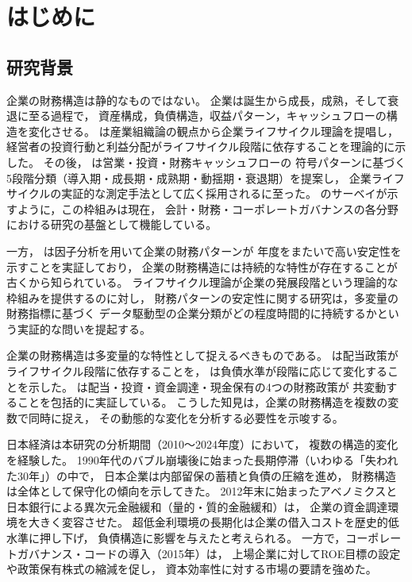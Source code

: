\chapter{はじめに}
\label{chap:intro}

\section{研究背景}
\label{sec:intro-background}

企業の財務構造は静的なものではない。
企業は誕生から成長，成熟，そして衰退に至る過程で，
資産構成，負債構造，収益パターン，キャッシュフローの構造を変化させる。
 は産業組織論の観点から企業ライフサイクル理論を提唱し，
経営者の投資行動と利益分配がライフサイクル段階に依存することを理論的に示した。
その後， は営業・投資・財務キャッシュフローの
符号パターンに基づく5段階分類（導入期・成長期・成熟期・動揺期・衰退期）を提案し，
企業ライフサイクルの実証的な測定手法として広く採用されるに至った。
 のサーベイが示すように，この枠組みは現在，
会計・財務・コーポレートガバナンスの各分野における研究の基盤として機能している。

一方， は因子分析を用いて企業の財務パターンが
年度をまたいで高い安定性を示すことを実証しており，
企業の財務構造には持続的な特性が存在することが古くから知られている。
ライフサイクル理論が企業の発展段階という理論的な枠組みを提供するのに対し，
財務パターンの安定性に関する研究は，多変量の財務指標に基づく
データ駆動型の企業分類がどの程度時間的に持続するかという実証的な問いを提起する。

企業の財務構造は多変量的な特性として捉えるべきものである。
 は配当政策がライフサイクル段階に依存することを，
 は負債水準が段階に応じて変化することを示した。
 は配当・投資・資金調達・現金保有の4つの財務政策が
共変動することを包括的に実証している。
こうした知見は，企業の財務構造を複数の変数で同時に捉え，
その動態的な変化を分析する必要性を示唆する。

日本経済は本研究の分析期間（2010〜2024年度）において，
複数の構造的変化を経験した。
1990年代のバブル崩壊後に始まった長期停滞（いわゆる「失われた30年」）の中で，
日本企業は内部留保の蓄積と負債の圧縮を進め，
財務構造は全体として保守化の傾向を示してきた。
2012年末に始まったアベノミクスと日本銀行による異次元金融緩和（量的・質的金融緩和）は，
企業の資金調達環境を大きく変容させた。
超低金利環境の長期化は企業の借入コストを歴史的低水準に押し下げ，
負債構造に影響を与えたと考えられる。
一方で，コーポレートガバナンス・コードの導入（2015年）は，
上場企業に対してROE目標の設定や政策保有株式の縮減を促し，
資本効率性に対する市場の要請を強めた。

